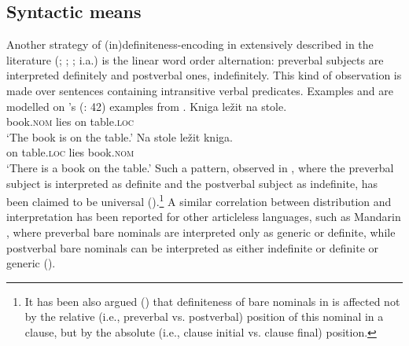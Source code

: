 \documentclass[output=paper]{langscibook}
\begin{document}
\subsection{Syntactic means}
Another strategy of (in)definiteness-encoding in  extensively described in the literature (\citealt{Pospelov1970}; \citealt{Fursenko1970}; \citealt{Chvany1973}; %
i.a.) is the linear word order alternation:
preverbal subjects are interpreted definitely and postverbal ones, indefinitely. This kind of observation is made over sentences containing intransitive verbal predicates. Examples  and  are modelled on \citeauthor{Kramsky1972}'s (\citeyear{Kramsky1972}: 42) examples from .%
\ea
\ea \label{ex:seres:9}
\gll Kniga			ležit	na	stole.\\
book.\textsc{nom} 	lies	on	table.\textsc{loc}\\
\glt `The book is on the table.'
\ex \label{ex:seres:10}
\gll Na		stole			ležit	kniga.\\
on	table.\textsc{loc} 	lies	book.\textsc{nom}\\
\glt `There is a book on the table.'
\z \z
\noindent Such a pattern, observed in , where the preverbal subject is interpreted as definite and the postverbal subject as indefinite, has been claimed to be universal (\citealt{Leiss2007}).\footnote{It has been also argued (\citealt{Simik.Burianova2020}) that definiteness of bare nominals in  is affected not by the relative (i.e., preverbal vs. postverbal) position of this nominal in a clause, but by the absolute (i.e., clause initial vs. clause final) position.}  A similar correlation between distribution and interpretation has been reported for
other articleless languages,
such as Mandarin , where preverbal bare nominals are interpreted only as generic or definite,
while postverbal bare nominals can be interpreted as either indefinite or definite or generic (\citealt{Cheng.Sybesma2014}).
\end{document}
